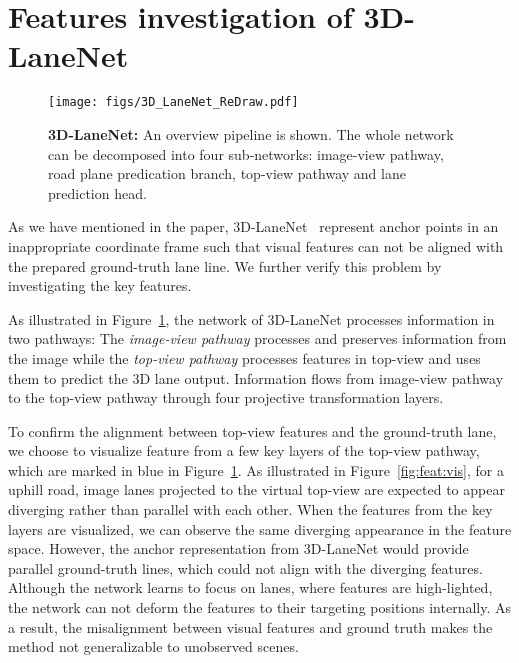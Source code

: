 \documentclass[10pt,twocolumn,letterpaper]{article}
\begin{document}
\cleardoublepage

\appendix



\section{Features investigation of 3D-LaneNet}
\label{sec:vis:feat}

\begin{figure}[!h]
  \centering
  \texttt{[image: figs/3D\_LaneNet\_ReDraw.pdf]}
\caption{\textbf{3D-LaneNet:} An overview pipeline is shown. The whole network can be decomposed into four sub-networks: image-view pathway, road plane predication branch, top-view pathway and lane prediction head.} \label{fig:3DLaneNet:Arch}
\end{figure}

As we have mentioned in the paper, 3D-LaneNet~\cite{Garnett:etal:ICCV2019} represent anchor points in an inappropriate coordinate frame such that visual features can not be aligned with the prepared ground-truth lane line. We further verify this problem by investigating the key features.

As illustrated in Figure~\ref{fig:3DLaneNet:Arch}, the network of 3D-LaneNet processes information in two pathways: The \textit{image-view pathway} processes and preserves information from the image while the \textit{top-view pathway} processes features in top-view and uses them to predict the 3D lane output. Information flows from image-view pathway to the top-view pathway through four projective transformation layers. 

To confirm the alignment between top-view features and the ground-truth lane, we choose to visualize feature from a few key layers of the top-view pathway, which are marked in blue in Figure~\ref{fig:3DLaneNet:Arch}. As illustrated in Figure~\ref{fig:feat:vis}, for a uphill road, image lanes projected to the virtual top-view are expected to appear diverging rather than parallel with each other. When the features from the key layers are visualized, we can observe the same diverging appearance in the feature space. However, the anchor representation from 3D-LaneNet would provide parallel ground-truth lines, which could not align with the diverging features. Although the network learns to focus on lanes, where features are high-lighted, the network can not deform the features to their targeting positions internally. As a result, the misalignment between visual features and ground truth makes the method not generalizable to unobserved scenes.
\end{document}
